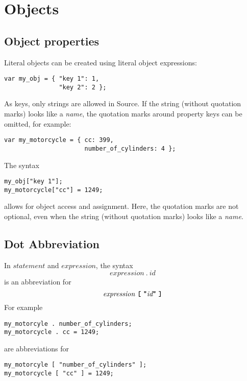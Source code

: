 \section*{Objects}

\subsection*{Object properties}

Literal objects can be created using literal object expressions:
\begin{lstlisting}
var my_obj = { "key 1": 1,
               "key 2": 2 };
\end{lstlisting}

As keys, only strings are allowed in Source.
If the string (without quotation marks) looks like a \textit{name}, the
quotation marks around property keys can be omitted, for example:
\begin{lstlisting}
var my_motorcycle = { cc: 399,
                      number_of_cylinders: 4 };
\end{lstlisting}

The syntax
\begin{lstlisting}
my_obj["key 1"];
my_motorcycle["cc"] = 1249;
\end{lstlisting}
allows for object access and assignment. Here, the quotation marks are not optional,
even when the string (without quotation marks) looks like a \textit{name}.

\subsection*{Dot Abbreviation}

In $\textit{statement}$ and $\textit{expression}$, the syntax
\[
\textit{expression} \ \texttt{.}\ \textit{id}
\]
is an abbreviation for
\[
\textit{expression} \ \textbf{\texttt{[}}\  \texttt{\bf "} \textit{id}
\texttt{\bf "}\ \textbf{\texttt{]}}
\]
For example
\begin{lstlisting}
my_motorcyle . number_of_cylinders;
my_motorcycle . cc = 1249;
\end{lstlisting}
are abbreviations for
\begin{lstlisting}
my_motorcyle [ "number_of_cylinders" ];
my_motorcycle [ "cc" ] = 1249;
\end{lstlisting}
